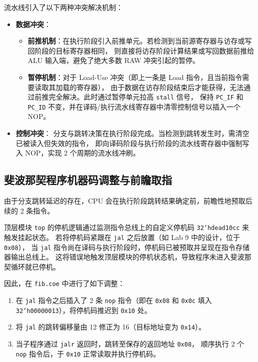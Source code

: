 \documentclass[12pt, a4paper]{ctexart}
\begin{document}
流水线引入了以下两种冲突解决机制：
\begin{itemize}
    \item \textbf{数据冲突}：
    \begin{itemize}
        \item \textbf{前推机制}：在执行阶段引入前推单元。若检测到当前源寄存器与访存或写回阶段的目标寄存器相同，
        则直接将访存阶段计算结果或写回数据前推给 ALU 输入端，避免了绝大多数 RAW 冲突引起的暂停。
        \item \textbf{暂停机制}：对于 Load-Use 冲突（即上一条是 Load 指令，且当前指令需要读取其加载的寄存器），
        由于数据在访存阶段结束后才能获得，无法通过前推完全解决。此时通过暂停单元拉高 \texttt{stall} 信号，
        保持 \texttt{PC\_IF} 和 \texttt{PC\_ID} 不变，并在译码/执行流水线寄存器中清零控制信号以插入一个 NOP。
    \end{itemize}
    \item \textbf{控制冲突}：
    分支与跳转决策在执行阶段完成。当检测到跳转发生时，需清空已被读入但失效的指令，
    即向译码阶段与执行阶段的流水线寄存器中强制写入 NOP，实现 2 个周期的流水线冲刷。
\end{itemize}

\subsection{斐波那契程序机器码调整与前瞻取指}

由于分支跳转延迟的存在，CPU 会在执行阶段跳转结果确定前，前瞻性地预取后续的 2 条指令。

顶层模块 \texttt{top} 的停机逻辑通过监测指令总线上的自定义停机码 \texttt{32'hdead10cc} 来触发挂起状态。
若将停机码紧跟在 \texttt{jal} 之后放置（如 Lab 9 中的设计，位于 \texttt{0x08}），
当 \texttt{jal} 指令尚在译码与执行阶段时，停机码已被预取并呈现在指令存储器输出总线上。
这将错误地触发顶层模块的停机状态机，导致程序未进入斐波那契循环就已停机。

因此，在 \texttt{fib.coe} 中进行了如下调整：
\begin{enumerate}
    \item 在 \texttt{jal} 指令之后插入了 2 条 \texttt{nop} 指令（即在 \texttt{0x08} 和
    \texttt{0x0c} 填入 \texttt{32'h00000013}），将停机码推迟到 \texttt{0x10} 处。
    \item 将 \texttt{jal} 的跳转偏移量由 12 修正为 16（目标地址变为 \texttt{0x14}）。
    \item 当子程序通过 \texttt{jalr} 返回时，跳转至保存的返回地址 \texttt{0x08}，
    顺序执行 2 个 \texttt{nop} 指令后，于 \texttt{0x10} 正常读取并执行停机码。
\end{enumerate}
\end{document}
